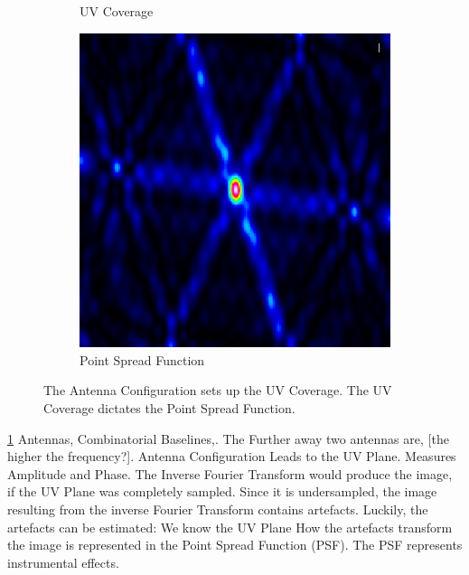 \begin{figure}[h!]
\begin{subfigure}[b]{0.3\linewidth}
		\caption{UV Coverage}
	\end{subfigure}
	\begin{subfigure}[b]{0.3\linewidth}
	\includegraphics[width=\linewidth]{./chapters/01.intro/img/PSF.png}
	\caption{Point Spread Function}
	\end{subfigure}
	\caption{The Antenna Configuration sets up the UV Coverage. The UV Coverage dictates the Point Spread Function.}
	\label{intro:ANT_UV_PSF}
\end{figure}

\ref{intro:ANT_UV_PSF}
Antennas, Combinatorial Baselines,. The Further away two antennas are, [the higher the frequency?]. Antenna Configuration Leads to the UV Plane. Measures Amplitude and Phase. The Inverse Fourier Transform would produce the image, if the UV Plane was completely sampled. Since it is undersampled, the image resulting from the inverse Fourier Transform contains artefacts. Luckily, the artefacts can be estimated: We know the UV Plane How the artefacts transform the image is represented in the Point Spread Function (PSF). The PSF represents instrumental effects.

